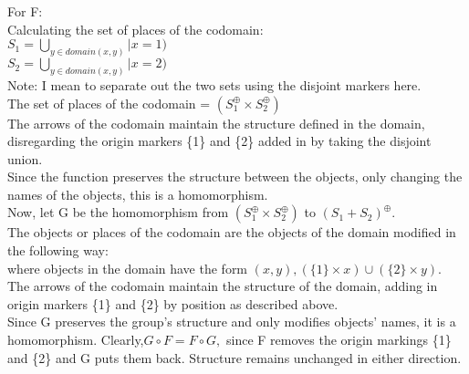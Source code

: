 For F:\\
Calculating the set of places of the codomain:\\
  $S_1 =  \bigcup_{ y \in domain (x, y)} | x=1)$\\
  $S_2 =  \bigcup_{y \in domain (x, y)} | x=2)$\\
Note: I mean to separate out the two sets using the disjoint markers here.\\
The set of places of the codomain = $(S_1 ^\oplus \times S_2 ^\oplus)$\\
The arrows of the codomain maintain the structure defined in the domain, disregarding the origin markers \{1\} and \{2\} added in by taking the disjoint union.\\
Since the function preserves the structure between the objects, only changing the names of the objects, this is a homomorphism.\\
Now, let G be the homomorphism from $(S_1 ^\oplus \times S_2 ^\oplus)$ to $(S_1 + S_2)^\oplus$. \\
The objects or places of the codomain are the objects of the domain modified in the following way:\\
where objects in the domain have the form $(x, y), (\{1\} \times x) \cup (\{2\} \times y).$\\
The arrows of the codomain maintain the structure of the domain, adding in origin markers \{1\} and \{2\} by position as described above.\\
Since G preserves the group's structure and only modifies objects' names, it is a homomorphism. 
Clearly,$ G \circ F = F \circ G,$ since F removes the origin markings  \{1\} and \{2\} and G puts them back. Structure remains unchanged in either direction.\\
\newpage

